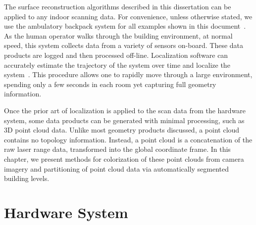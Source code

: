 \documentclass[12pt,onecolumn,oneside]{book}
\begin{document}
The surface reconstruction algorithms described in this dissertation can be applied to any indoor scanning data.  For convenience, unless otherwise stated, we use the ambulatory backpack system for all examples shown in this document~\cite{liu2010indoor,Backpack}.  As the human operator walks through the building environment, at normal speed, this system collects data from a variety of sensors on-board.  These data products are logged and then processed off-line.  Localization software can accurately estimate the trajectory of the system over time and localize the system~\cite{NickJournal}.  This procedure allows one to rapidly move through a large environment, spending only a few seconds in each room yet capturing full geometry information.

Once the prior art of localization is applied to the scan data from the hardware system, some data products can be generated with minimal processing, such as 3D point cloud data.  Unlike most geometry products discussed, a point cloud contains no topology information.  Instead, a point cloud is a concatenation of the raw laser range data, transformed into the global coordinate frame.  In this chapter, we present methods for colorization of these point clouds from camera imagery and partitioning of point cloud data via automatically segmented building levels.

\section{Hardware System}
\label{sec:mechanical}



\end{document}
